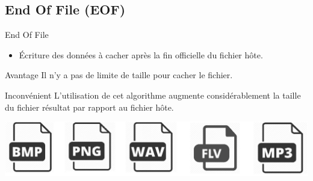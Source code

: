 \documentclass{beamer}
\begin{document}
    \subsection{End Of File (EOF)}
    \begin{frame}
    
	\begin{block}{End Of File}
	\begin{itemize}
	[circle]
	\item Écriture des données à cacher après la fin officielle du fichier 
	hôte. 
	\end{itemize}
	\end{block}
	
	\begin{exampleblock}{Avantage} 
	Il n'y a pas de limite de taille pour cacher le fichier. 
	\end{exampleblock}
	
	\begin{alertblock}{Inconvénient} 
	L'utilisation de cet algorithme augmente considérablement la taille du 
	fichier résultat par rapport au fichier hôte. 
	\end{alertblock}
	
	\hspace{1cm}
    \includegraphics[scale=0.2]{pictures/eof.png}
    
    \end{frame}
    
\end{document}
